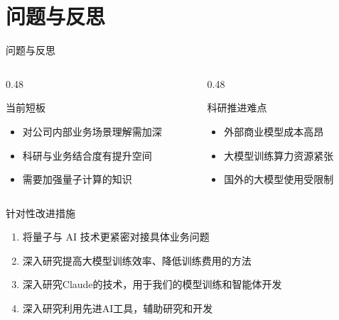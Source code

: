 \documentclass[aspectratio=169,11pt]{beamer}
\begin{document}
\section{问题与反思}
\begin{frame}{问题与反思}
    \begin{columns}[T]
        \begin{column}{0.48\textwidth}
            \begin{alertblock}{当前短板}
                \begin{itemize}
                    \item 对公司内部业务场景理解需加深
                    \item 科研与业务结合度有提升空间
                    \item 需要加强量子计算的知识
                \end{itemize}
            \end{alertblock}
        \end{column}
        \begin{column}{0.48\textwidth}
            \begin{alertblock}{科研推进难点}
                \begin{itemize}
                    \item 外部商业模型成本高昂
                    \item 大模型训练算力资源紧张
                    \item 国外的大模型使用受限制
                \end{itemize}
            \end{alertblock}
        \end{column}
    \end{columns}
    
    \vspace{0.4cm}
    
    \begin{block}{针对性改进措施}
        \begin{enumerate}
            \item 将量子与 AI 技术更紧密对接具体业务问题
            \item 深入研究提高大模型训练效率、降低训练费用的方法
            \item 深入研究Claude的技术，用于我们的模型训练和智能体开发
            \item 深入研究利用先进AI工具，辅助研究和开发
        \end{enumerate}
    \end{block}
\end{frame}
\end{document}
